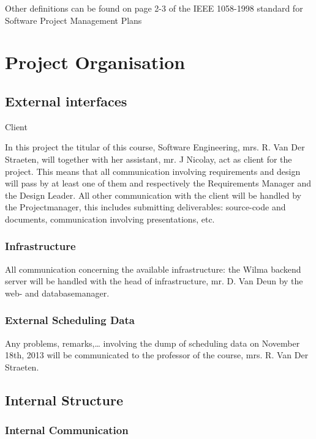 \documentclass[12pt]{article}
\begin{document}
Other definitions can be found on page 2-3 of the IEEE 1058-1998
standard for Software Project Management Plans

\section{Project Organisation}\label{project-organisation}

\subsection{External interfaces}\label{external-interfaces}

Client

In this project the titular of this course, Software
Engineering, mrs. R. Van Der Straeten, will together with her
assistant, mr. J Nicolay, act as client for the project. This means that
all communication involving requirements and design will pass by at
least one of them and respectively the
Requirements Manager and the
Design Leader. All other communication with the
client will be handled by the Projectmanager,
this includes submitting deliverables: source-code and documents,
communication involving presentations, etc.

\subsubsection{Infrastructure}\label{infrastructure}

All communication concerning the available infrastructure: the
Wilma backend server will be handled with the head of
infrastructure, mr. D. Van Deun by the web- and databasemanager.

\subsubsection{External Scheduling Data}\label{external-scheduling-data}

Any problems, remarks,\ldots{} involving the dump of scheduling data on
November 18th, 2013 will be communicated to the professor of the course,
mrs. R. Van Der Straeten.

\subsection{Internal Structure}\label{internal-structure}

\subsubsection{Internal Communication}\label{internal-communication}
\end{document}
